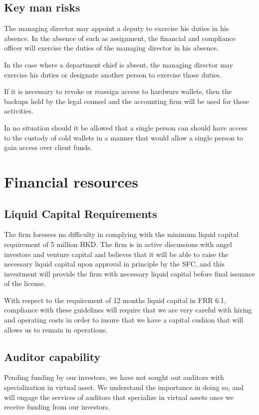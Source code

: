 \subsection{Key man risks}
The managing director may appoint a deputy to exercise his duties in
his absence.  In the absence of such as assignment, the financial and
compliance officer will exercise the duties of the managing director
in his absence.

In the case where a department chief is absent, the managing director
may exercise his duties or designate another person to exercise those
duties.

If it is necessary to revoke or reassign access to hardware wallets,
then the backups held by the legal counsel and the accounting firm
will be used for these activities.

In no situation should it be allowed that a single person can should
have access to the custody of cold wallets in a manner that would allow a
single person to gain access over client funds.

\section{Financial resources}
\subsection{Liquid Capital Requirements}

The firm foresees no difficulty in complying with the minimum liquid
capital requirement of 5 million HKD.  The firm is in active
discussions with angel investors and venture capital and believes that
it will be able to raise the necessary liquid capital upon approval in
principle by the SFC, and this investment will provide the firm with
necessary liquid capital before final issuance of the license.

With respect to the requirement of 12 months liquid capital in FRR
6.1, compliance with these guidelines will require that we are very
careful with hiring and operating costs in order to insure that we
have a capital cushion that will allows us to remain in operations.


\subsection{Auditor capability}
Pending funding by our investors, we have not sought out auditors with
specialization in virtual asset.  We understand the importance in
doing so, and will engage the services of auditors that specialize in
virtual assets once we receive funding from our investors.

